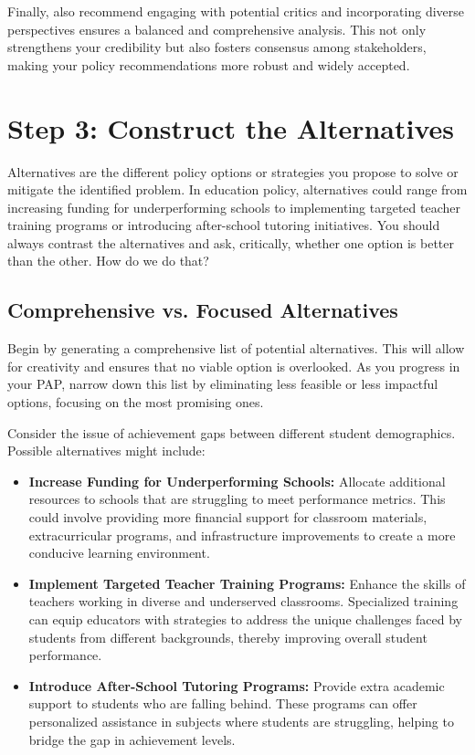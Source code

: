 \documentclass{article}
\theoremstyle{definition}
\theoremstyle{plain}
\begin{document}
Finally, \citet{Bardach2020} also recommend engaging with potential critics and
incorporating diverse perspectives ensures a balanced and comprehensive
analysis. This not only strengthens your credibility but also fosters consensus
among stakeholders, making your policy recommendations more robust and widely
accepted. 

\section{Step 3: Construct the Alternatives}

Alternatives are the different policy options or strategies you propose to solve
or mitigate the identified problem. In education policy, alternatives could
range from increasing funding for underperforming schools to implementing
targeted teacher training programs or introducing after-school tutoring
initiatives. You should always contrast the alternatives and ask, critically,
whether one option is better than the other. How do we do that?

\subsection{Comprehensive vs. Focused Alternatives}

Begin by generating a comprehensive list of potential alternatives. This will
allow for creativity and ensures that no viable option is overlooked. As you
progress in your PAP, narrow down this list by eliminating less feasible or less impactful
options, focusing on the most promising ones.

\begin{tcolorbox}[colback=gray!5!white, colframe=gray!75!black, title=Example: Reducing Achievement Gaps in Education, breakable]
  Consider the issue of achievement gaps between different student demographics. Possible alternatives might include:
  
  \begin{itemize}
    \item \textbf{Increase Funding for Underperforming Schools:} Allocate additional resources to schools that are struggling to meet performance metrics. This could involve providing more financial support for classroom materials, extracurricular programs, and infrastructure improvements to create a more conducive learning environment.
  
    \item \textbf{Implement Targeted Teacher Training Programs:} Enhance the skills of teachers working in diverse and underserved classrooms. Specialized training can equip educators with strategies to address the unique challenges faced by students from different backgrounds, thereby improving overall student performance.
  
    \item \textbf{Introduce After-School Tutoring Programs:} Provide extra academic
    support to students who are falling behind. These programs can offer
    personalized assistance in subjects where students are struggling, helping to
    bridge the gap in achievement levels.
    \end{itemize}
\end{tcolorbox}
\end{document}
